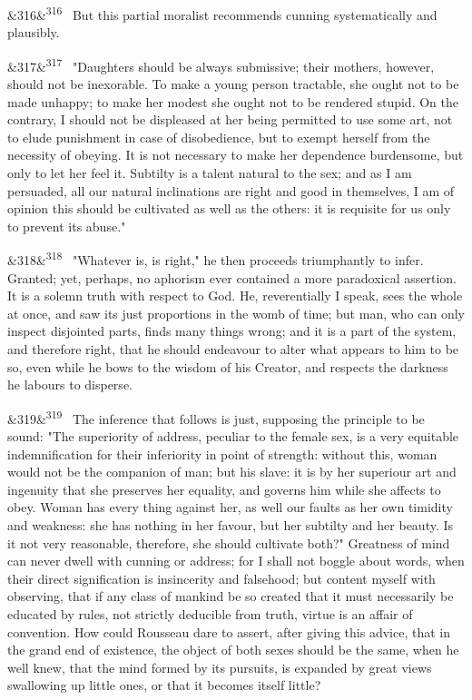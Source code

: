 \documentclass[12pt]{article}
\newcommand{\para}[1][]{\par\noindent\ifx&#1&\else\textsuperscript{\footnotesize #1}~\fi}
\begin{document}
\para[316] But this partial moralist recommends cunning systematically and plausibly.

\para[317] "Daughters should be always submissive; their mothers, however, should not be inexorable. To make a young person tractable, she ought not to be made unhappy; to make her modest she ought not to be rendered stupid. On the contrary, I should not be displeased at her being permitted to use some art, not to elude punishment in case of disobedience, but to exempt herself from the necessity of obeying. It is not necessary to make her dependence burdensome, but only to let her feel it. Subtilty is a talent natural to the sex; and as I am persuaded, all our natural inclinations are right and good in themselves, I am of opinion this should be cultivated as well as the others: it is requisite for us only to prevent its abuse."

\para[318] "Whatever is, is right," he then proceeds triumphantly to infer. Granted; yet, perhaps, no aphorism ever contained a more paradoxical assertion. It is a solemn truth with respect to God. He, reverentially I speak, sees the whole at once, and saw its just proportions in the womb of time; but man, who can only inspect disjointed parts, finds many things wrong; and it is a part of the system, and therefore right, that he should endeavour to alter what appears to him to be so, even while he bows to the wisdom of his Creator, and respects the darkness he labours to disperse.

\para[319] The inference that follows is just, supposing the principle to be sound: "The superiority of address, peculiar to the female sex, is a very equitable indemnification for their inferiority in point of strength: without this, woman would not be the companion of man; but his slave: it is by her superiour art and ingenuity that she preserves her equality, and governs him while she affects to obey. Woman has every thing against her, as well our faults as her own timidity and weakness: she has nothing in her favour, but her subtilty and her beauty. Is it not very reasonable, therefore, she should cultivate both?" Greatness of mind can never dwell with cunning or address; for I shall not boggle about words, when their direct signification is insincerity and falsehood; but content myself with observing, that if any class of mankind be so created that it must necessarily be educated by rules, not strictly deducible from truth, virtue is an affair of convention. How could Rousseau dare to assert, after giving this advice, that in the grand end of existence, the object of both sexes should be the same, when he well knew, that the mind formed by its pursuits, is expanded by great views swallowing up little ones, or that it becomes itself little?
\end{document}
